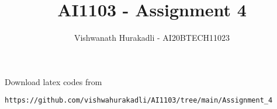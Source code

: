 \documentclass[journal,12pt,twocolumn]{IEEEtran}
\DeclareMathOperator*{\Res}{Res}
\begin{document}
\newtheorem{theorem}{Theorem}[section]
\newtheorem{problem}{Problem}
\newtheorem{proposition}{Proposition}[section]
\newtheorem{lemma}{Lemma}[section]
\newtheorem{corollary}[theorem]{Corollary}
\newtheorem{example}{Example}[section]
\newtheorem{definition}[problem]{Definition}

\newcommand{\BEQA}{\begin{eqnarray}}
\newcommand{\EEQA}{\end{eqnarray}}
\newcommand{\define}{\stackrel{\triangle}{=}}

\raggedbottom
\setlength{\parindent}{0pt}
\providecommand{\mbf}{\mathbf}
\providecommand{\pr}[1]{\ensuremath{\Pr\left(#1\right)}}
\providecommand{\qfunc}[1]{\ensuremath{Q\left(#1\right)}}
\providecommand{\sbrak}[1]{\ensuremath{{}\left[#1\right]}}
\providecommand{\lsbrak}[1]{\ensuremath{{}\left[#1\right.}}
\providecommand{\rsbrak}[1]{\ensuremath{{}\left.#1\right]}}
\providecommand{\brak}[1]{\ensuremath{\left(#1\right)}}
\providecommand{\lbrak}[1]{\ensuremath{\left(#1\right.}}
\providecommand{\rbrak}[1]{\ensuremath{\left.#1\right)}}
\providecommand{\cbrak}[1]{\ensuremath{\left\{#1\right\}}}
\providecommand{\lcbrak}[1]{\ensuremath{\left\{#1\right.}}
\providecommand{\rcbrak}[1]{\ensuremath{\left.#1\right\}}}
\theoremstyle{remark}
\newtheorem{rem}{Remark}
\newcommand{\sgn}{\mathop{\mathrm{sgn}}}
\providecommand{\abs}[1]{\(\left\vert#1\right\vert\)}
\providecommand{\res}[1]{\Res\displaylimits_{#1}} 
\providecommand{\norm}[1]{\(\left\lVert#1\right\rVert\)}
\providecommand{\mtx}[1]{\mathbf{#1}}
\providecommand{\mean}[1]{E\(\left[ #1 \right]\)}
\providecommand{\fourier}{\overset{\mathcal{F}}{ \rightleftharpoons}}
\providecommand{\system}{\overset{\mathcal{H}}{ \longleftrightarrow}}
\newcommand{\solution}{\noindent \textbf{Solution: }}
\newcommand{\cosec}{\,\text{cosec}\,}
\providecommand{\dec}[2]{\ensuremath{\overset{#1}{\underset{#2}{\gtrless}}}}
\newcommand{\myvec}[1]{\ensuremath{\begin{pmatrix}#1\end{pmatrix}}}
\newcommand{\mydet}[1]{\ensuremath{}}
\makeatletter
{}
\makeatother
\let\StandardTheFigure\thefigure
\let\vec\mathbf
\renewcommand{\thefigure}{\theproblem}
\def\putbox#1#2#3{\makebox[0in][l]{\makebox[#1][l]{}\raisebox{\baselineskip}[0in][0in]{\raisebox{#2}[0in][0in]{#3}}}}
     \def\rightbox#1{\makebox[0in][r]{#1}}
     \def\centbox#1{\makebox[0in]{#1}}
     \def\topbox#1{\raisebox{-\baselineskip}[0in][0in]{#1}}
     \def\midbox#1{\raisebox{-0.5\baselineskip}[0in][0in]{#1}}
\vspace{3cm}
\title{AI1103 - Assignment 4}
\author{Vishwanath Hurakadli - AI20BTECH11023}
\maketitle
\newpage
\bigskip
\renewcommand{\thefigure}{\theenumi}
\renewcommand{\thetable}{\theenumi}
%
Download latex codes from 
%
\begin{lstlisting}
https://github.com/vishwahurakadli/AI1103/tree/main/Assignment_4
\end{lstlisting}
\end{document}
